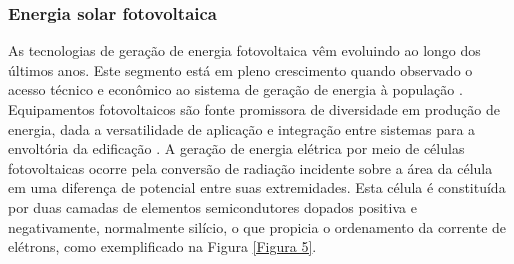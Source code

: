 \begin{onehalfspace}
    \subsubsection{Energia solar fotovoltaica}
As tecnologias de geração de energia fotovoltaica vêm evoluindo ao longo dos últimos anos. Este segmento está em pleno crescimento quando observado o acesso técnico e econômico ao sistema de geração de energia à população \cite{Pereira2017}. Equipamentos fotovoltaicos são fonte promissora de diversidade em produção de energia, dada a versatilidade de aplicação e integração entre sistemas para a envoltória da edificação \cite{Sorgato2018}.\vspace{0.3cm} \newline
A geração de energia elétrica por meio de células fotovoltaicas ocorre pela conversão de radiação incidente sobre a área da célula em uma diferença de potencial entre suas extremidades. Esta célula é constituída por duas camadas de elementos semicondutores dopados positiva e negativamente, normalmente silício, o que propicia o ordenamento da corrente de elétrons, como exemplificado na Figura \ref{Figura 5}.


\end{onehalfspace}

